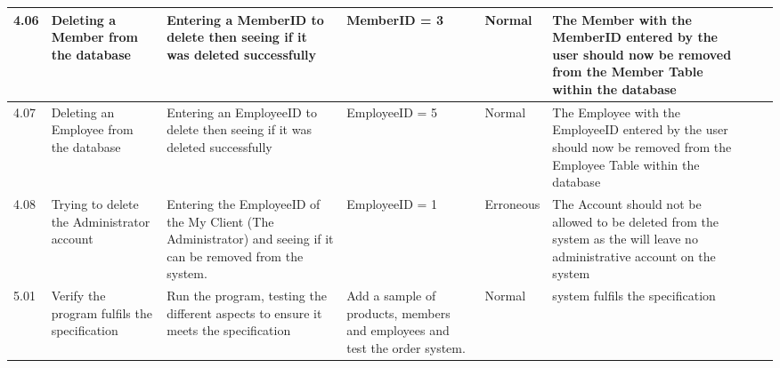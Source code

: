\begin{landscape}
\begin{flushleft}
\begin{longtable}{|p{1.5cm}|p{2.5cm}|p{2.5cm}|p{2cm}|p{2cm}|p{2cm}|p{2cm}|p{2cm}|}
	4.06 & Deleting a Member from the database &  Entering a MemberID to delete then seeing if it was deleted successfully & MemberID = 3 & Normal & The Member with the MemberID entered by the user should now be removed from the Member Table within the database && \\ \hline
	4.07 & Deleting an Employee from the database &  Entering an EmployeeID to delete then seeing if it was deleted successfully & EmployeeID = 5 & Normal & The Employee with the EmployeeID entered by the user should now be removed from the Employee Table within the database && \\ \hline
	4.08 & Trying to delete the Administrator account  & Entering the EmployeeID of the My Client (The Administrator) and seeing if it can be removed from the system. & EmployeeID = 1 & Erroneous & The Account should not be allowed to be deleted from the system as the will leave no administrative account on the system && \\ \hline
	5.01 & Verify the program fulfils the specification & Run the program, testing the different aspects to ensure it meets the specification & Add a sample of products, members and employees and test the order system.  & Normal &system fulfils the specification & & \\ \hline
	

    \end{longtable}
\end{flushleft}
\end{landscape}